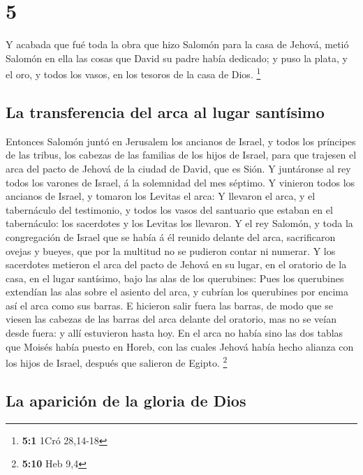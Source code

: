 \hypertarget{section-4}{%
\section{5}\label{section-4}}

 Y acabada que fué toda la obra que hizo Salomón para la
casa de Jehová, metió Salomón en ella las cosas que David su padre había
dedicado; y puso la plata, y el oro, y todos los vasos, en los tesoros
de la casa de Dios. \footnote{\textbf{5:1} 1Cró 28,14-18}

\hypertarget{la-transferencia-del-arca-al-lugar-santuxedsimo}{%
\subsection{La transferencia del arca al lugar
santísimo}\label{la-transferencia-del-arca-al-lugar-santuxedsimo}}

 Entonces Salomón juntó en Jerusalem los ancianos de Israel,
y todos los príncipes de las tribus, los cabezas de las familias de los
hijos de Israel, para que trajesen el arca del pacto de Jehová de la
ciudad de David, que es Sión.  Y juntáronse al rey todos los
varones de Israel, á la solemnidad del mes séptimo.  Y
vinieron todos los ancianos de Israel, y tomaron los Levitas el arca:
 Y llevaron el arca, y el tabernáculo del testimonio, y
todos los vasos del santuario que estaban en el tabernáculo: los
sacerdotes y los Levitas los llevaron.  Y el rey Salomón, y
toda la congregación de Israel que se había á él reunido delante del
arca, sacrificaron ovejas y bueyes, que por la multitud no se pudieron
contar ni numerar.  Y los sacerdotes metieron el arca del
pacto de Jehová en su lugar, en el oratorio de la casa, en el lugar
santísimo, bajo las alas de los querubines:  Pues los
querubines extendían las alas sobre el asiento del arca, y cubrían los
querubines por encima así el arca como sus barras.  E
hicieron salir fuera las barras, de modo que se viesen las cabezas de
las barras del arca delante del oratorio, mas no se veían desde fuera: y
allí estuvieron hasta hoy.  En el arca no había sino las
dos tablas que Moisés había puesto en Horeb, con las cuales Jehová había
hecho alianza con los hijos de Israel, después que salieron de Egipto.
\footnote{\textbf{5:10} Heb 9,4}

\hypertarget{la-apariciuxf3n-de-la-gloria-de-dios}{%
\subsection{La aparición de la gloria de
Dios}\label{la-apariciuxf3n-de-la-gloria-de-dios}}

